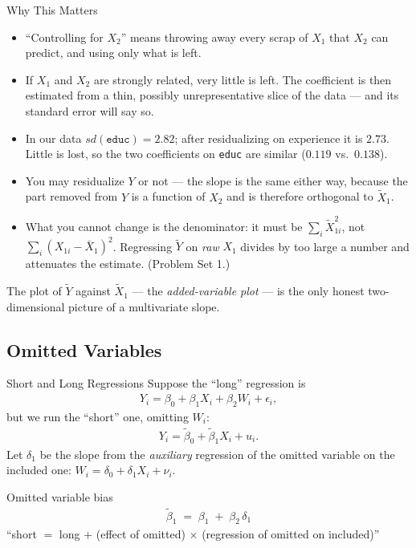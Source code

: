\documentclass[aspectratio=169,11pt,xcolor=dvipsnames]{beamer}
\begin{document}
\begin{frame}[shrink=10]{Why This Matters}
\begin{itemize}\itemsep5pt
  \item ``Controlling for $X_2$'' means \alert{throwing away every scrap of $X_1$
        that $X_2$ can predict}, and using only what is left.
  \item If $X_1$ and $X_2$ are strongly related, very little is left. The
        coefficient is then estimated from a thin, possibly unrepresentative slice
        of the data --- and its standard error will say so.
  \item In our data $sd(\texttt{educ}) = 2.82$; after residualizing on experience
        it is $2.73$. Little is lost, so the two coefficients on \texttt{educ}
        are similar ($0.119$ vs.\ $0.138$).
  \item You may residualize $Y$ or not --- the slope is the same either way,
        because the part removed from $Y$ is a function of $X_2$ and is therefore
        orthogonal to $\tilde X_1$.
  \item \alert{What you cannot change is the denominator}: it must be
        $\sum_i \tilde X_{1i}^2$, not $\sum_i (X_{1i}-\bar X_1)^2$. Regressing
        $\tilde Y$ on \emph{raw} $X_1$ divides by too large a number and
        attenuates the estimate. (Problem Set 1.)
\end{itemize}
\vskip3pt
The plot of $\tilde Y$ against $\tilde X_1$ --- the \emph{added-variable plot} ---
is the only honest two-dimensional picture of a multivariate slope.
\end{frame}

\subsection*{Omitted Variables}
\begin{frame}\subsectionpage\end{frame}

\begin{frame}{Short and Long Regressions}
Suppose the ``long'' regression is
\begin{align*}
  Y_i = \beta_0 + \beta_1 X_i + \beta_2 W_i + \epsilon_i ,
\end{align*}
but we run the ``short'' one, omitting $W_i$:
\begin{align*}
  Y_i = \tilde\beta_0 + \tilde\beta_1 X_i + u_i .
\end{align*}
Let $\delta_1$ be the slope from the \emph{auxiliary} regression of the omitted
variable on the included one: $W_i = \delta_0 + \delta_1 X_i + \nu_i$.
\vskip6pt
\pause
\begin{block}{Omitted variable bias}
\begin{align*}
  \boxed{\;\tilde\beta_1 \;=\; \beta_1 \;+\; \beta_2\,\delta_1\;}
\end{align*}
\centering
\small ``short $=$ long $+$ (effect of omitted) $\times$ (regression of omitted
on included)''
\end{block}
\end{frame}
\end{document}
